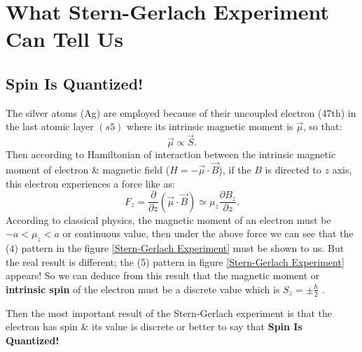 \documentclass{article}
\begin{document}
\section{What Stern-Gerlach Experiment Can Tell Us}

\subsection{Spin Is Quantized!}
 The silver atoms (Ag) are employed because of their uncoupled electron (47th) in the last atomic layer $(s5)$ where its intrinsic magnetic moment is $\vec{\mu}$, so that:
 \begin{equation}
     \vec{\mu}\propto \vec{S}.
 \end{equation}
 Then according to Hamiltonian of interaction between the intrinsic magnetic moment of electron \& magnetic field  ($H=-\vec{\mu}\cdot\vec{B}$), if the $B$ is directed to $z$ axis, this electron experiences a force like as:
 \begin{equation}
     F_{z}=\frac{\partial}{\partial z}\left(\vec{\mu}\cdot\vec{B}\right)\simeq\mu_{z}\frac{\partial B_z}{\partial z}.
 \end{equation}
According to classical physics, the magnetic moment of an electron must be $-a<\mu_z<a$ or continuous value, then under the above force we can see that the (4) pattern in the figure \ref{Stern-Gerlach Experiment} must be shown to us. But the real result is different; the (5) pattern in figure \ref{Stern-Gerlach Experiment} appears! So we can deduce from this result that the magnetic moment or \textbf{intrinsic spin} of the electron must be a discrete value which is $S_z=\pm\frac{\hbar}{2}$ \cite{Sakurai_Napolitano_2020}.

Then the most important result of the Stern-Gerlach experiment is that the electron has spin \& its value is discrete or better to say that \textbf{Spin Is Quantized!}
\end{document}
